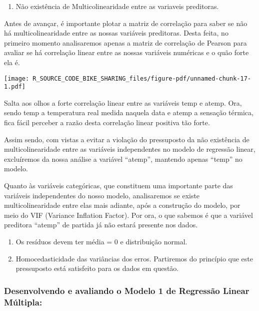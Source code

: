 \documentclass[
  letterpaper,
  DIV=11,
  numbers=noendperiod]{scrartcl}
\providecommand{\tightlist}{%
  \setlength{\itemsep}{0pt}\setlength{\parskip}{0pt}}\usepackage{longtable,booktabs,array}
\begin{document}
\begin{enumerate}
\def\labelenumi{\arabic{enumi})}
\tightlist
\item
  Não existência de Multicolinearidade entre as variaveis preditoras.
\end{enumerate}

Antes de avançar, é importante plotar a matriz de correlação para saber
se não há multicolinearidade entre as nossas variáveis preditoras. Desta
feita, no primeiro momento analisaremos apenas a matriz de correlação de
Pearson para avaliar se há correlação linear entre as nossas variáveis
numéricas e o quão forte ela é.

\begin{center}
\texttt{[image: R\_SOURCE\_CODE\_BIKE\_SHARING\_files/figure-pdf/unnamed-chunk-17-1.pdf]}
\end{center}

Salta aos olhos a forte correlação linear entre as variáveis temp e
atemp. Ora, sendo temp a temperatura real medida naquela data e atemp a
sensação térmica, fica fácil perceber a razão desta correlação linear
positiva tão forte.

Assim sendo, com vistas a evitar a violação do pressuposto da não
existência de multicolinearidade entre as variáveis independentes no
modelo de regressão linear, excluíremos da nossa análise a variável
``atemp'', mantendo apenas ``temp'' no modelo.

Quanto às variáveis categóricas, que constituem uma importante parte das
variáveis independentes do nosso modelo, analisaremos se existe
multicolinearidade entre elas mais adiante, após a construção do modelo,
por meio do VIF (Variance Inflation Factor). Por ora, o que sabemos é
que a variável preditora ``atemp'' de partida já não estará presente nos
dados.

\begin{enumerate}
\def\labelenumi{\arabic{enumi})}
\setcounter{enumi}{1}
\item
  Os resíduos devem ter média = 0 e distribuição normal.
\item
  Homocedasticidade das variâncias dos erros. Partiremos do princípio
  que este pressuposto está satisfeito para os dados em questão.
\end{enumerate}

\subsubsection{\texorpdfstring{\textbf{Desenvolvendo e avaliando o
Modelo 1 de Regressão Linear
Múltipla:}}{Desenvolvendo e avaliando o Modelo 1 de Regressão Linear Múltipla:}}\label{desenvolvendo-e-avaliando-o-modelo-1-de-regressuxe3o-linear-muxfaltipla}
\end{document}
